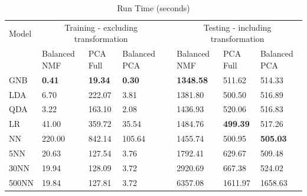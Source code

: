 \documentclass{article}
\begin{document}
\squeezetable
\begin{table}
\caption {\label{tab:times} Run Time (seconds)}
\begin{ruledtabular}
\begin{tabular}{llllllll}
 Model & \multicolumn{3}{c}{Training - excluding transformation} &  & \multicolumn{3}{c}{Testing - including transformation}    \\ 
\cline{2-4} \cline{6-8} 
        & Balanced NMF   & PCA Full   &  Balanced PCA                                             &             
	&  Balanced NMF  & PCA Full   & Balanced PCA                                                 \\    \hline
 GNB   & \textbf{0.41}   & \textbf{19.34} & \textbf{0.30}  &
    & \textbf{1348.58}   & 511.62 & 514.33         \\ 
 LDA   & 6.70    & 222.07 & 3.81 &
    & 1381.80   & 500.50 & 516.89           \\
 QDA   & 3.22   & 163.10    & 2.08  &
    & 1436.93   & 520.06    & 516.83        \\
 LR & 41.00 & 359.72    & 35.54 &
    & 1484.76   & \textbf{499.39}    & 517.26    \\
 NN & 220.00    & 842.14    & 105.64    &
    & 1455.74   & 500.95    & \textbf{505.03}    \\
 5NN & 20.63    & 127.54    & 3.76  &
    & 1792.41   & 629.67    & 509.48    \\
 30NN   & 19.94 & 128.09    & 3.72  &
    & 2920.69   & 667.38    & 524.02    \\
 500NN  & 19.84 & 127.81    & 3.72  &
    & 6357.08   & 1611.97   & 1658.63 \\

\end{tabular}
\end{ruledtabular}
\begin{tabbing}
\end{tabbing}
\end{table}


\cleardoublepage
\printbibliography
\end{document}
